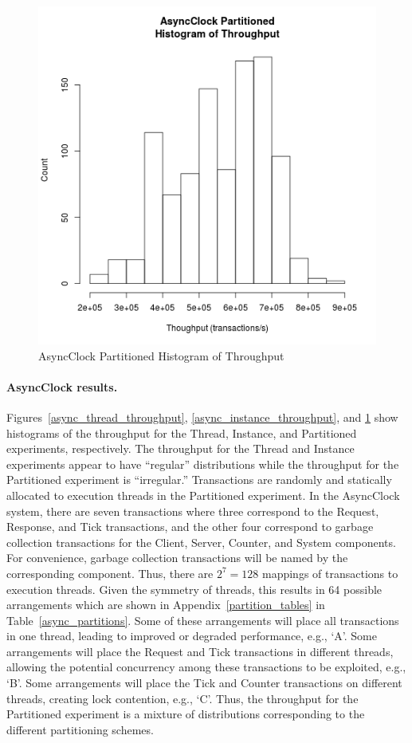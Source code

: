 \begin{figure}[H]
\center
\includegraphics[height=.4\textheight]{async_partitioned_throughput_hist.png}
\caption{AsyncClock Partitioned Histogram of Throughput\label{async_partitioned_throughput}}
\end{figure}

\paragraph{AsyncClock results.}
Figures~\ref{async_thread_throughput}, \ref{async_instance_throughput}, and \ref{async_partitioned_throughput} show histograms of the throughput for the Thread, Instance, and Partitioned experiments, respectively.
The throughput for the Thread and Instance experiments appear to have ``regular'' distributions while the throughput for the Partitioned experiment is ``irregular.''
Transactions are randomly and statically allocated to execution threads in the Partitioned experiment.
In the AsyncClock system, there are seven transactions where three correspond to the Request, Response, and Tick transactions, and the other four correspond to garbage collection transactions for the Client, Server, Counter, and System components.
For convenience, garbage collection transactions will be named by the corresponding component.
Thus, there are $2^7 = 128$ mappings of transactions to execution threads.
Given the symmetry of threads, this results in 64 possible arrangements which are shown in Appendix~\ref{partition_tables} in Table~\ref{async_partitions}.
Some of these arrangements will place all transactions in one thread, leading to improved or degraded performance, e.g., `A'.
Some arrangements will place the Request and Tick transactions in different threads, allowing the potential concurrency among these transactions to be exploited, e.g., `B'.
Some arrangements will place the Tick and Counter transactions on different threads, creating lock contention, e.g., `C'.
Thus, the throughput for the Partitioned experiment is a mixture of distributions corresponding to the different partitioning schemes.

